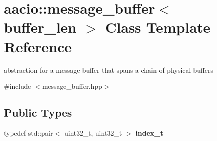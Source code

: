 \hypertarget{classaacio_1_1message__buffer}{}\section{aacio\+:\+:message\+\_\+buffer$<$ buffer\+\_\+len $>$ Class Template Reference}
\label{classaacio_1_1message__buffer}


abstraction for a message buffer that spans a chain of physical buffers  




{\ttfamily \#include $<$message\+\_\+buffer.\+hpp$>$}

\subsection*{Public Types}
\begin{DoxyCompactItemize}
\item 
\mbox{\label{classaacio_1_1message__buffer_abbaf43d3a0d56e762eb7e1d278e8afd4}} 
typedef std\+::pair$<$ uint32\+\_\+t, uint32\+\_\+t $>$ {\bfseries index\+\_\+t}
\end{DoxyCompactItemize}

